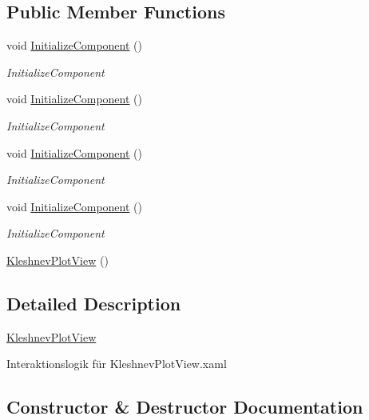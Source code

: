 \subsection*{Public Member Functions}
\begin{DoxyCompactItemize}
\item 
void \hyperlink{class_rowing_monitor_1_1_view_1_1_kleshnev_plot_view_a378530c44bc7cb052db6f3a13cfc2db8}{Initialize\+Component} ()
\begin{DoxyCompactList}\small\item\em Initialize\+Component \end{DoxyCompactList}\item 
void \hyperlink{class_rowing_monitor_1_1_view_1_1_kleshnev_plot_view_a378530c44bc7cb052db6f3a13cfc2db8}{Initialize\+Component} ()
\begin{DoxyCompactList}\small\item\em Initialize\+Component \end{DoxyCompactList}\item 
void \hyperlink{class_rowing_monitor_1_1_view_1_1_kleshnev_plot_view_a378530c44bc7cb052db6f3a13cfc2db8}{Initialize\+Component} ()
\begin{DoxyCompactList}\small\item\em Initialize\+Component \end{DoxyCompactList}\item 
void \hyperlink{class_rowing_monitor_1_1_view_1_1_kleshnev_plot_view_a378530c44bc7cb052db6f3a13cfc2db8}{Initialize\+Component} ()
\begin{DoxyCompactList}\small\item\em Initialize\+Component \end{DoxyCompactList}\item 
\hyperlink{class_rowing_monitor_1_1_view_1_1_kleshnev_plot_view_a3e703e3daef530061957b5c15978ae56}{Kleshnev\+Plot\+View} ()
\end{DoxyCompactItemize}


\subsection{Detailed Description}
\hyperlink{class_rowing_monitor_1_1_view_1_1_kleshnev_plot_view}{Kleshnev\+Plot\+View} 

Interaktionslogik für Kleshnev\+Plot\+View.\+xaml 

\subsection{Constructor \& Destructor Documentation}
\mbox{\label{class_rowing_monitor_1_1_view_1_1_kleshnev_plot_view_a3e703e3daef530061957b5c15978ae56}} 
